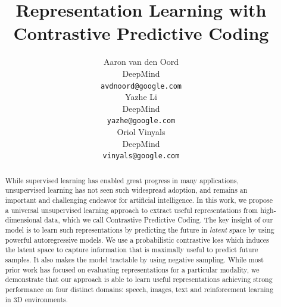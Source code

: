 \documentclass{article}
\title{Representation Learning with \\Contrastive Predictive Coding}
\author{
  Aaron van den Oord \\
  DeepMind \\
  \texttt{avdnoord@google.com} \\
  \And
  Yazhe Li \\
  DeepMind \\
  \texttt{yazhe@google.com} \\
  \And
  Oriol Vinyals \\
  DeepMind \\
  \texttt{vinyals@google.com} \\
}
\begin{document}
\maketitle


\begin{abstract}

While supervised learning has enabled great progress in many applications, unsupervised learning has not seen such widespread adoption, and remains an important and challenging endeavor for artificial intelligence.
In this work, we propose a universal unsupervised learning approach to extract useful representations from high-dimensional data, which we call Contrastive Predictive Coding.
The key insight of our model is to learn such representations by predicting the future in \emph{latent} space by using powerful autoregressive models. We use a probabilistic contrastive loss which induces the latent space to capture information that is maximally useful to predict future samples. It also makes the model tractable by using negative sampling.
While most prior work has focused on evaluating representations for a particular modality, we demonstrate that our approach is able to learn useful representations achieving strong performance on four distinct domains: speech, images, text and reinforcement learning in 3D environments.
\end{abstract}










\end{document}
